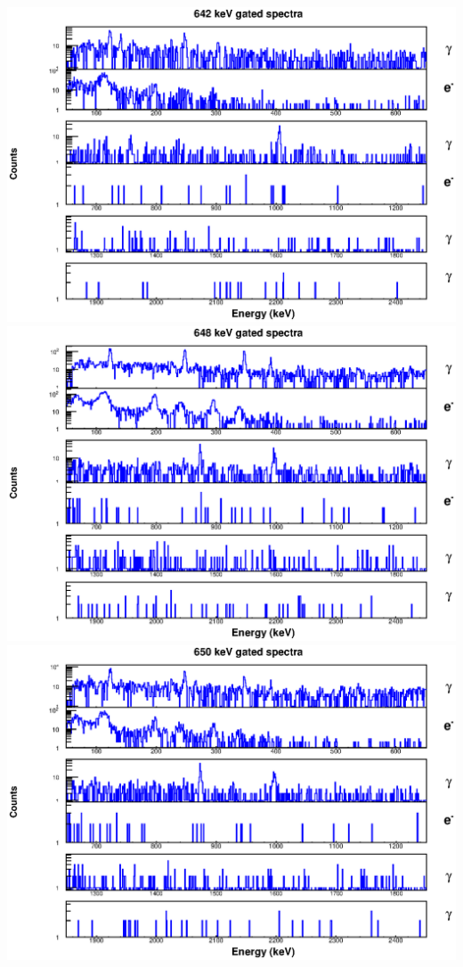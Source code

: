 \includegraphics[scale=0.8]{154Gd_Appendix/642_combined.eps}
\includegraphics[scale=0.8]{154Gd_Appendix/648_combined.eps}
\includegraphics[scale=0.8]{154Gd_Appendix/650_combined.eps}

